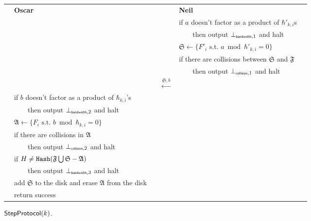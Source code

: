 \documentclass[11pt]{llncs}
\begin{document}
\begin{figure}
\begin{center}
\begin{tabular}{|lcl|}\hline
~~{\bf Oscar}                       &                                                      & {\bf Neil}~\\
                                   &                                                       &if $a$ doesn't factor as a product of $\hbar'_{k,i}$s~~\\
                                   &                                                       &~~~~then output $\bot_{\mbox{{\tiny {\sf bandwidth}}},1}$ and halt~~\\
                                   &                                                       &$\mathfrak{S}\leftarrow\{F'_i \mbox{~s.t.~} a \bmod \hbar'_{k,i} =0\}$~~\\
  ~~                                 &                                                       &if there are collisions between $\mathfrak{S}$ and $\mathfrak{F}$~~\\
                                   &                                                       &~~~~then output $\bot_{\mbox{{\tiny {\sf collision}}},1}$ and halt~~\\
                                   &~~{\LARGE $\stackrel{\mathfrak{S},b}{\longleftarrow}$} &\\
~~if $b$ doesn't factor as a product of $\hbar_{k,i}$'s&&\\
~~~~~~then output $\bot_{\mbox{{\tiny {\sf bandwidth}}},2}$ and halt &&\\
~~$\mathfrak{A}\leftarrow\{F_i \mbox{~s.t.~} b \bmod \hbar_{k,i} =0\}$ &&\\
~~if there are collisions in $\mathfrak{A}$ &                                   & \\
~~~~~~then output $\bot_{\mbox{{\tiny {\sf collision}}},2}$ and halt~~&                      &~~\\
~~if $H \neq \mbox{{\tt Hash}}(\mathfrak{F}\bigcup\mathfrak{S} - \mathfrak{A})$ &                                                      &\\
~~~~~~then output $\bot_{\mbox{{\tiny {\sf bandwidth}}},3}$ and halt &&\\
~~add $\mathfrak{S}$ to the disk and erase $\mathfrak{A}$ from the disk &                                                      &\\
~~return {\sf success} &                                                      &\\\hline
\end{tabular}
\end{center}
\caption{$\mbox{{\sf StepProtocol}}(k)$.}\label{fig:step}
\end{figure}
\end{document}

